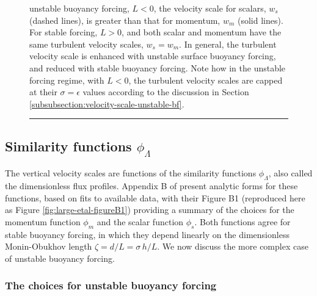 \begin{figure}[h!t]
\begin{center}
{  unstable buoyancy forcing, $L<0$, the velocity scale for scalars,
  $w_{s}$ (dashed lines), is greater than that for momentum, $w_{m}$
  (solid lines).  For stable forcing, $L>0$, and both scalar and
  momentum have the same turbulent velocity scales, $w_{s} = w_{m}$.
  In general, the turbulent velocity scale is enhanced with unstable
  surface buoyancy forcing, and reduced with stable buoyancy forcing.
  Note how in the unstable forcing regime, with $L<0$, the turbulent
  velocity scales are capped at their $\sigma = \epsilon$ values
  according to the discussion in Section
  \ref{subsubsection:velocity-scale-unstable-bf}.  }
\label{fig:kpp-figure2-reproduced}
\end{center}
\rule{\textwidth}{0.005in}
\end{figure}



\subsection{Similarity functions $\phi_{\Lambda}$}
\label{subsection:similarity-functions}

The vertical velocity scales are functions of the similarity functions
$\phi_{\Lambda}$, also called the dimensionless flux profiles.
Appendix B of \cite{LargeKPP} present analytic forms for these
functions, based on fits to available data, with their Figure B1
(reproduced here as Figure \ref{fig:large-etal-figureB1}) providing a
summary of the choices for the momentum function $\phi_{m}$ and the
scalar function $\phi_{s}$.  Both functions agree for stable buoyancy
forcing, in which they depend linearly on the dimensionless
Monin-Obukhov length $\zeta = d/L = \sigma \, h/L$.  We now discuss
the more complex case of unstable buoyancy forcing.


\subsubsection{The \cite{LargeKPP} choices for unstable buoyancy forcing}

